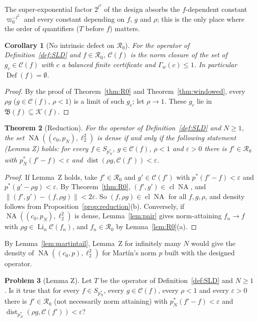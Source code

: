 \documentclass[10pt]{amsart}
\newtheorem{theorem}{Theorem}[section]
\newtheorem{corollary}[theorem]{Corollary}
\theoremstyle{definition}
\newtheorem{problem}[theorem]{Problem}
\theoremstyle{remark}
\newcommand{\NA}{\operatorname{NA}}
\newcommand{\dist}{\operatorname{dist}}
\newcommand{\Cset}{\mathcal C}
\newcommand{\Li}{\operatorname*{Li}}
\newcommand{\cl}{\operatorname{cl}}
\newcommand{\Def}{\operatorname{Def}}
\begin{document}
The super-exponential factor $2^{l^3}$ of the design absorbs the
$f$-dependent constant $\varpi_0^{-l^2}$ and every constant depending on
$f$, $g$ and $\rho$; this is the only place where the order of quantifiers
($T$ before $f$) matters.

\begin{corollary}[No intrinsic defect on $\mathcal R_0$]\label{cor:nodefectR0}
For the operator of Definition~\ref{def:SLD} and $f\in\mathcal R_0$,
$\Cset(f)$ is the norm closure of the set of $g_c\in\Cset(f)$ with $c$ a
balanced finite certificate and $\Gamma_w(c)\le1$.  In particular
$\Def(f)=\emptyset$.
\end{corollary}

\begin{proof}
By the proof of Theorem~\ref{thm:R0} and Theorem~\ref{thm:windowed}, every
$\rho g$ ($g\in\Cset(f)$, $\rho<1$) is a limit of such $g_c$; let
$\rho\to1$.  These $g_c$ lie in $\mathfrak B(f)\subseteq\mathcal K(f)$.
\end{proof}

\begin{theorem}[Reduction]\label{thm:reductionZ}
For the operator of Definition~\ref{def:SLD} and $N\ge1$, the set
$\NA((c_0,p_N),\ell_2^2)$ is dense if and only if the following statement
\textup{(Lemma Z)} holds: for every $f\in S_{p_N^*}$, $g\in\Cset(f)$,
$\rho<1$ and $\varepsilon>0$ there is $f'\in\mathcal R_0$ with
$p_N^*(f'-f)<\varepsilon$ and $\dist(\rho g,\Cset(f'))<\varepsilon$.
\end{theorem}

\begin{proof}
If Lemma~Z holds, take $f'\in\mathcal R_0$ and $g'\in\Cset(f')$ with
$p^*(f'-f)<\varepsilon$ and $p^*(g'-\rho g)<\varepsilon$.  By
Theorem~\ref{thm:R0}, $(f',g')\in\cl\NA$, and $\|(f',g')-(f,\rho g)\|<
2\varepsilon$.  So $(f,\rho g)\in\cl\NA$ for all $f,g,\rho$, and density
follows from Proposition~\ref{prop:reduction}(b).  Conversely, if
$\NA((c_0,p_N),\ell_2^2)$ is dense, Lemma~\ref{lem:pair} gives
norm-attaining $f_n\to f$ with $\rho g\in\Li_n\Cset(f_n)$, and
$f_n\in\mathcal R_0$ by Lemma~\ref{lem:R0}(a).
\end{proof}

By Lemma~\ref{lem:martintail}, Lemma~Z for infinitely many $N$ would give
the density of $\NA((c_0,p),\ell_2^2)$ for Mart\'in's norm $p$ built with
the designed operator.

\begin{problem}[Lemma Z]\label{prob:lemmaZ}
Let $T$ be the operator of Definition~\ref{def:SLD} and $N\ge1$.  Is it true
that for every $f\in S_{p_N^*}$, every $g\in\Cset(f)$, every $\rho<1$ and
every $\varepsilon>0$ there is $f'\in\mathcal R_0$ \textup{(}not necessarily
norm attaining\textup{)} with $p_N^*(f'-f)<\varepsilon$ and
$\dist_{p_N^*}(\rho g,\Cset(f'))<\varepsilon$?
\end{problem}
\end{document}
